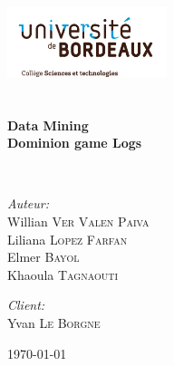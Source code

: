 \begin{titlepage}
\begin{center}

\includegraphics[width=0.35\textwidth]{./logo}~\\[1cm]


\textsc{\Large }\\[0.5cm]

\HRule \\[0.4cm]

{\huge \bfseries Data Mining\\
Dominion game Logs \\[0.4cm] }

\HRule \\[1.5cm]

\begin{minipage}{0.4\textwidth}
\begin{flushleft} \large
\emph{Auteur:}\\
Willian \textsc{Ver Valen Paiva }\\
Liliana \textsc{Lopez Farfan}\\
Elmer \textsc{Bayol}\\
Khaoula \textsc{Tagnaouti}\\
\end{flushleft}
\end{minipage}
\begin{minipage}{0.4\textwidth}
\begin{flushright} \large
\emph{Client:} \\
Yvan \textsc{Le Borgne}\\
\end{flushright}
\end{minipage}

\vfill

{\large \today}

\end{center}
\end{titlepage}
